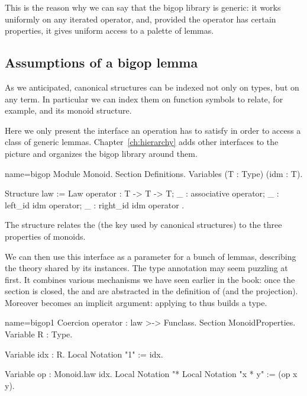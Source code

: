 This is the reason why we can say that the bigop library is generic:
it works uniformly on any iterated operator, and, provided the operator
has certain properties, it gives uniform access to a palette of lemmas.

\subsection{Assumptions of a bigop lemma}\label{sec:bigoplemmas}

As we anticipated, canonical structures can be indexed not only on
types, but on any term.  In particular we can index them on function
symbols to relate, for example,  and its monoid structure.

Here we only present the  interface an operation has to
satisfy in order to access a class of generic lemmas.
Chapter~\ref{ch:hierarchy} adds other interfaces to the picture and organizes
the bigop library around them.

\begin{coq}{name=bigop}{}
Module Monoid.
Section Definitions.
Variables (T : Type) (idm : T).

Structure law := Law {
  operator : T -> T -> T;
  _ : associative operator;
  _ : left_id idm operator;
  _ : right_id idm operator
}.
\end{coq}

The  structure relates the  (the key used by
canonical structures) to the three properties of monoids.

We can then use this interface as a parameter for a bunch of lemmas,
describing the theory shared by  its instances. The 
type annotation may seem puzzling at first. It combines various mechanisms
we have seen earlier in the book: once the section  is
closed, the   and  are
abstracted in the definition of  (and the 
projection).  Moreover  becomes an implicit argument: applying
 to  thus builds a type.

\begin{coq}{name=bigop1}{}
Coercion operator : law >-> Funclass.
Section MonoidProperties.
Variable R : Type.

Variable idx : R.
Local Notation "1" := idx.

Variable op : Monoid.law idx.
Local Notation "*%
Local Notation "x * y" := (op x y).
\end{coq}

